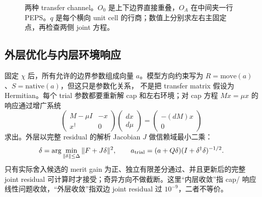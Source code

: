 \begin{figure}[htbp]
\centering
{}
\caption{两种 transfer channel。$O_0$ 是上下边界直接重叠，$O_A$ 在中间夹一行
PEPS。$q$ 是每个横向 unit cell 的行商；数值上分别求左右主固定点，再检查两侧 joint 方程。}
\label{fig:two-channels}
\end{figure}

\subsection{外层优化与内层环境响应}

固定 $\chi$ 后，所有允许的边界参数组成向量 $a$。模型方向约束写为
$R=\mathrm{move}(a)$、$S=\mathrm{native}(a)$，但这只是参数化关系，
不是把 transfer matrix 假设为 Hermitian。每个 trial 参数都要重新解
cap 和左右环境；对 cap 方程 $M x=\mu x$ 的响应通过增广系统
\begin{equation}
 \begin{pmatrix}M-\mu I&-x\\x^\dagger&0\end{pmatrix}
 \begin{pmatrix}dx\\d\mu\end{pmatrix}
 =\begin{pmatrix}-(dM)x\\0\end{pmatrix}
\end{equation}
求出。外层以完整 residual 的解析 Jacobian $J$ 做信赖域最小二乘：
\begin{equation}
 \delta=\arg\min_{\|\delta\|\leq\Delta}\|F+J\delta\|^2,
 \qquad a_{\rm trial}=(a+Q\delta)(I+\delta^\dagger\delta)^{-1/2}.
\end{equation}
只有实际舍入候选的 merit gain 为正、独立有限差分通过、并且更新后的完整
joint residual 可计算时才接受；奇异方向不做截断。这里“内层收敛”指 cap/
响应线性问题收敛，“外层收敛”指双边 joint residual 过 $10^{-9}$，二者不等价。

